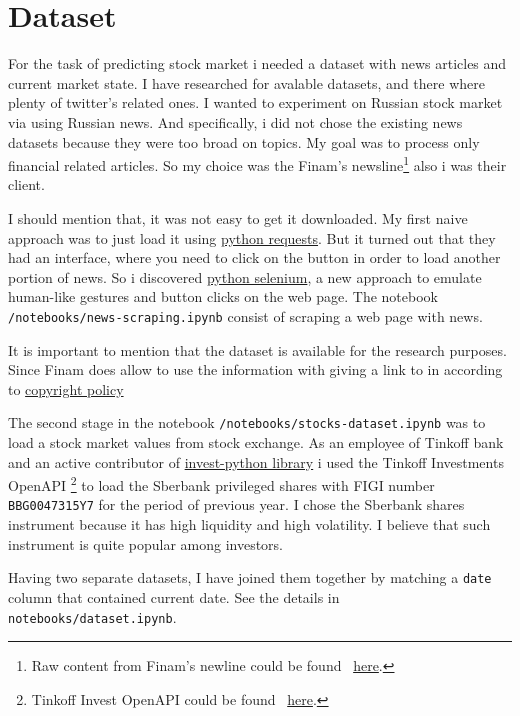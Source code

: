 \documentclass{article}
\begin{document}
\section{Dataset}

For the task of predicting stock market i needed a dataset with news articles and current market state.
I have researched for avalable datasets, and there where plenty of twitter's related ones.
I wanted to experiment on Russian stock market via using Russian news. 
And specifically, i did not chose the existing news datasets because they were too broad on topics. My goal was to process only financial related articles.
So my choice was the Finam's newsline\footnote{Raw content from Finam's newline could be found ~\href{https://www.finam.ru/publications/selection/united/}{here}.} also i was their client.

I should mention that, it was not easy to get it downloaded. 
My first naive approach was to just load it using \href{https://pypi.org/project/requests/}{python requests}. But it turned out that they had an interface, where you need to click on the button in order to load another portion of news. So i discovered \href{https://pypi.org/project/selenium/}{python selenium}, a new approach to emulate human-like gestures and button clicks on the web page.
The notebook \texttt{/notebooks/news-scraping.ipynb} consist of scraping a web page with news.

It is important to mention that the dataset is available for the research purposes. 
Since Finam does allow to use the information with giving a link to in according to \href{https://www.finam.ru/about/copyright/}{copyright policy}

The second stage in the notebook \texttt{/notebooks/stocks-dataset.ipynb} was to load a stock market values from stock exchange. 
As an employee of Tinkoff bank and an active contributor of \href{https://github.com/Tinkoff/invest-python}{invest-python library} i used the Tinkoff Investments OpenAPI \footnote{Tinkoff Invest OpenAPI could be found ~\href{https://www.tinkoff.ru/invest/open-api/}{here}.} to load the Sberbank privileged shares with FIGI number \texttt{BBG0047315Y7} for the period of previous year. I chose the Sberbank shares instrument because it has high liquidity and high volatility. I believe that such instrument is quite popular among investors.

Having two separate datasets, I have joined them together by matching a \texttt{date} column that contained current date. 
See the details in \texttt{notebooks/dataset.ipynb}.
\end{document}
